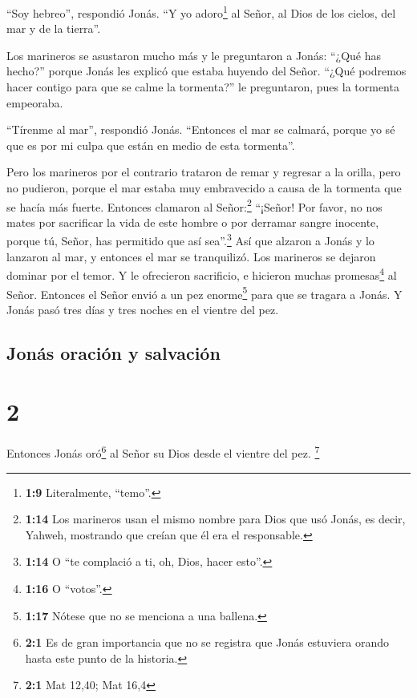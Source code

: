  ``Soy hebreo'', respondió Jonás. ``Y yo adoro\footnote{\textbf{1:9}
  Literalmente, ``temo''.} al Señor, al Dios de los cielos, del mar y de
la tierra''.

 Los marineros se asustaron mucho más y le preguntaron a
Jonás: ``¿Qué has hecho?'' porque Jonás les explicó que estaba huyendo
del Señor.  ``¿Qué podremos hacer contigo para que se
calme la tormenta?'' le preguntaron, pues la tormenta empeoraba.

 ``Tírenme al mar'', respondió Jonás. ``Entonces el mar
se calmará, porque yo sé que es por mi culpa que están en medio de esta
tormenta''.

 Pero los marineros por el contrario trataron de remar y
regresar a la orilla, pero no pudieron, porque el mar estaba muy
embravecido a causa de la tormenta que se hacía más fuerte.
 Entonces clamaron al Señor:\footnote{\textbf{1:14} Los
  marineros usan el mismo nombre para Dios que usó Jonás, es decir,
  Yahweh, mostrando que creían que él era el responsable.} ``¡Señor! Por
favor, no nos mates por sacrificar la vida de este hombre o por derramar
sangre inocente, porque tú, Señor, has permitido que así
sea''.\footnote{\textbf{1:14} O ``te complació a ti, oh, Dios, hacer
  esto''.}  Así que alzaron a Jonás y lo lanzaron al mar,
y entonces el mar se tranquilizó.  Los marineros se
dejaron dominar por el temor. Y le ofrecieron sacrificio, e hicieron
muchas promesas\footnote{\textbf{1:16} O ``votos''.} al Señor.
 Entonces el Señor envió a un pez enorme\footnote{\textbf{1:17}
  Nótese que no se menciona a una ballena.} para que se tragara a Jonás.
Y Jonás pasó tres días y tres noches en el vientre del pez.

\hypertarget{jonuxe1s-oraciuxf3n-y-salvaciuxf3n}{%
\subsection{Jonás oración y
salvación}\label{jonuxe1s-oraciuxf3n-y-salvaciuxf3n}}

\hypertarget{section-1}{%
\section{2}\label{section-1}}

 Entonces Jonás oró\footnote{\textbf{2:1} Es de gran
  importancia que no se registra que Jonás estuviera orando hasta este
  punto de la historia.} al Señor su Dios desde el vientre del pez.
\footnote{\textbf{2:1} Mat 12,40; Mat 16,4}

